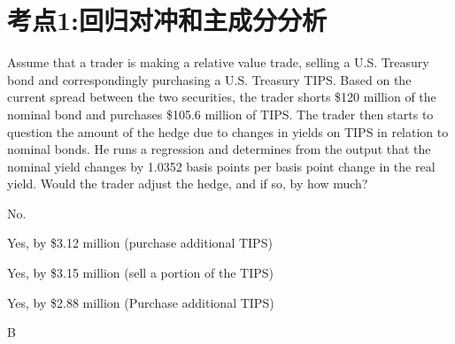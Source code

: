 \documentclass{article}
\newcounter{question} %
\begin{document}
 \tableofcontents %
\newpage




\section{考点1:回归对冲和主成分分析}
\setcounter{question}{0}



\begin{question}
    Assume that a trader is making a relative value trade, selling a U.S. Treasury bond and
    correspondingly purchasing a U.S. Treasury TIPS. Based on the current spread between the two
    securities, the trader shorts \$120 million of the nominal bond and purchases \$105.6 million of
    TIPS. The trader then starts to question the amount of the hedge due to changes in yields on
    TIPS in relation to nominal bonds. He runs a regression and determines from the output that the
    nominal yield changes by 1.0352 basis points per basis point change in the real yield. Would
    the trader adjust the hedge, and if so, by how much?
\end{question}

\begin{choices}
    \item No.
    \item Yes, by \$3.12 million (purchase additional TIPS)
    \item Yes, by \$3.15 million (sell a portion of the TIPS)
    \item Yes, by \$2.88 million (Purchase additional TIPS)
\end{choices}

\begin{correctanswer}
    B
\end{correctanswer}
\end{document}
